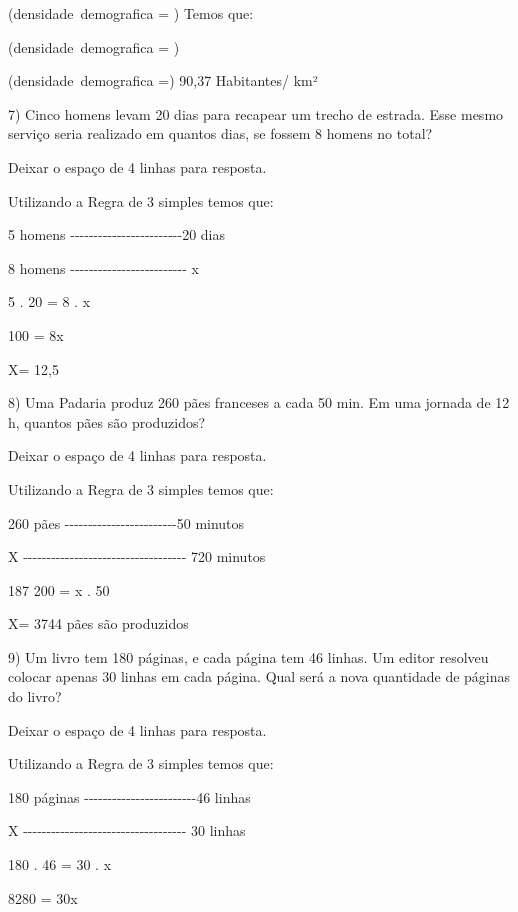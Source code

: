 (densidade\ demografica = )
Temos que:

(densidade\ demografica = )

(densidade\ demografica =) 90,37 Habitantes/ km²

7) Cinco homens levam 20 dias para recapear um trecho de estrada. Esse
mesmo serviço seria realizado em quantos dias, se fossem 8 homens no
total?

Deixar o espaço de 4 linhas para resposta.

Utilizando a Regra de 3 simples temos que:

5 homens
-\/-\/-\/-\/-\/-\/-\/-\/-\/-\/-\/-\/-\/-\/-\/-\/-\/-\/-\/-\/-\/-\/-\/-20
dias

8 homens
-\/-\/-\/-\/-\/-\/-\/-\/-\/-\/-\/-\/-\/-\/-\/-\/-\/-\/-\/-\/-\/-\/-\/-\/-
x

5 . 20 = 8 . x

100 = 8x

X= 12,5

8) Uma Padaria produz 260 pães franceses a cada 50 min. Em uma jornada
de 12 h, quantos pães são produzidos?

Deixar o espaço de 4 linhas para resposta.

Utilizando a Regra de 3 simples temos que:

260 pães
-\/-\/-\/-\/-\/-\/-\/-\/-\/-\/-\/-\/-\/-\/-\/-\/-\/-\/-\/-\/-\/-\/-\/-50
minutos

X
-\/-\/-\/-\/-\/-\/-\/-\/-\/-\/-\/-\/-\/-\/-\/-\/-\/-\/-\/-\/-\/-\/-\/-\/-\/-\/-\/-\/-\/-\/-\/-\/-\/-\/-
720 minutos

187 200 = x . 50

X= 3744 pães são produzidos

9) Um livro tem 180 páginas, e cada página tem 46 linhas. Um editor
resolveu colocar apenas 30 linhas em cada página. Qual será a nova
quantidade de páginas do livro?

Deixar o espaço de 4 linhas para resposta.

Utilizando a Regra de 3 simples temos que:

180 páginas
-\/-\/-\/-\/-\/-\/-\/-\/-\/-\/-\/-\/-\/-\/-\/-\/-\/-\/-\/-\/-\/-\/-\/-46
linhas

X
-\/-\/-\/-\/-\/-\/-\/-\/-\/-\/-\/-\/-\/-\/-\/-\/-\/-\/-\/-\/-\/-\/-\/-\/-\/-\/-\/-\/-\/-\/-\/-\/-\/-\/-
30 linhas

180 . 46 = 30 . x

8280 = 30x

